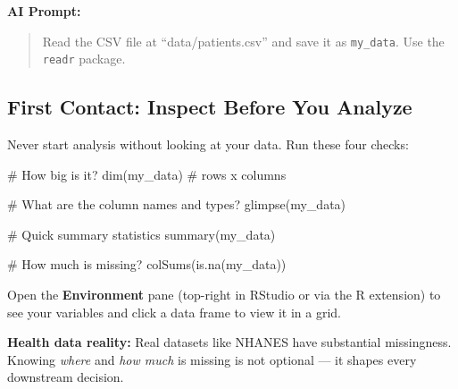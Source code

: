 \documentclass[
  letterpaper,
  DIV=11,
  numbers=noendperiod,
  oneside]{scrreprt}
\newenvironment{Shaded}{\begin{snugshade}}{\end{snugshade}}
\newcommand{\CommentTok}[1]{\textcolor[rgb]{0.37,0.37,0.37}{#1}}
\newcommand{\FunctionTok}[1]{\textcolor[rgb]{0.28,0.35,0.67}{#1}}
\newcommand{\NormalTok}[1]{\textcolor[rgb]{0.00,0.23,0.31}{#1}}
\begin{document}
\textbf{AI Prompt:}

\begin{quote}
Read the CSV file at ``data/patients.csv'' and save it as
\texttt{my\_data}. Use the \texttt{readr} package.
\end{quote}

\subsection*{First Contact: Inspect Before You
Analyze}\label{first-contact-inspect-before-you-analyze}

Never start analysis without looking at your data. Run these four
checks:

\begin{Shaded}
\begin{Highlighting}[numbers=left,,]
\CommentTok{\# How big is it?}
\FunctionTok{dim}\NormalTok{(my\_data)          }\CommentTok{\# rows x columns}

\CommentTok{\# What are the column names and types?}
\FunctionTok{glimpse}\NormalTok{(my\_data)}

\CommentTok{\# Quick summary statistics}
\FunctionTok{summary}\NormalTok{(my\_data)}

\CommentTok{\# How much is missing?}
\FunctionTok{colSums}\NormalTok{(}\FunctionTok{is.na}\NormalTok{(my\_data))}
\end{Highlighting}
\end{Shaded}

Open the \textbf{Environment} pane (top-right in RStudio or via the R
extension) to see your variables and click a data frame to view it in a
grid.

\begin{tcolorbox}[enhanced jigsaw, opacitybacktitle=0.6, colbacktitle=quarto-callout-warning-color!10!white, breakable, opacityback=0, coltitle=black, toptitle=1mm, bottomrule=.15mm, colframe=quarto-callout-warning-color-frame, bottomtitle=1mm, colback=white, leftrule=.75mm, rightrule=.15mm, title=\textcolor{quarto-callout-warning-color}{\faExclamationTriangle}\hspace{0.5em}{Warning}, left=2mm, arc=.35mm, toprule=.15mm, titlerule=0mm]

\textbf{Health data reality:} Real datasets like NHANES have substantial
missingness. Knowing \emph{where} and \emph{how much} is missing is not
optional --- it shapes every downstream decision.

\end{tcolorbox}
\end{document}
